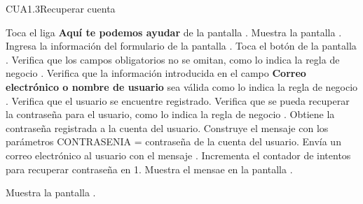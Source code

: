 \begin{UseCase}{CUA1.3}{Recuperar cuenta}

\end{UseCase}


 \begin{UCtrayectoria}
    \UCpaso[\UCactor] Toca el liga \textbf{Aquí te podemos ayudar} de la pantalla .
    \UCpaso[\UCsist]  Muestra la pantalla .
    \UCpaso[\UCactor] Ingresa la información del formulario de la pantalla . \label{cua13:tb} 
    \UCpaso[\UCactor] Toca el botón  de la pantalla . 
    \UCpaso[\UCsist] Verifica que los campos obligatorios no se omitan, como lo indica la regla de negocio . 
    \UCpaso[\UCsist] Verifica que la información introducida en el campo \textbf{Correo electrónico o nombre de usuario} sea válida como lo indica la regla de negocio . 
    \UCpaso[\UCsist] Verifica que el usuario se encuentre registrado. 
    \UCpaso[\UCsist] Verifica que se pueda recuperar la contraseña para el usuario, como lo indica la regla de negocio . 
    \UCpaso[\UCsist] Obtiene la contraseña registrada a la cuenta del usuario.\label{cua13:g1}
    \UCpaso[\UCsist] Construye el mensaje  con los parámetros CONTRASENIA = contraseña de la cuenta del usuario.
    \UCpaso[\UCsist] Envía un correo electrónico al usuario con el mensaje .
    \UCpaso[\UCsist] Incrementa el contador de intentos para recuperar contraseña en 1.
    \UCpaso[\UCsist] Muestra el mensae  en la pantalla .

    \UCpaso[\UCsist] Muestra la pantalla .
    
   
 \end{UCtrayectoria}
 
